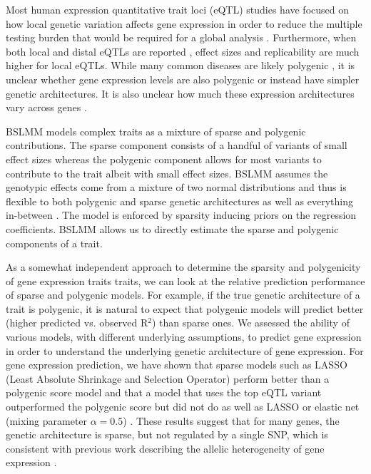 \documentclass[10pt,letterpaper]{article}
\begin{document}
Most human expression quantitative trait loci (eQTL) studies have focused on how local genetic variation affects gene expression in order to reduce the multiple testing burden that would be required for a global analysis \cite{Albert_2015, Stranger_2012}. Furthermore, when both local and distal eQTLs are reported \cite{Stranger_2007,Innocenti_2011,Wright_2014}, effect sizes and replicability are much higher for local eQTLs. While many common diseases are likely polygenic \cite{Purcell_2009,Stahl_2012,Morris_2012}, it is unclear whether gene expression levels are also polygenic or instead have simpler genetic architectures. It is also unclear how much these expression architectures vary across genes \cite{Albert_2015}. 

BSLMM models complex traits as a mixture of sparse and polygenic contributions. The sparse component consists of a handful of variants of small effect sizes whereas the polygenic component allows for most variants to contribute to the trait albeit with small effect sizes. BSLMM assumes the genotypic effects come from a mixture of two normal distributions and thus is flexible to both polygenic and sparse genetic architectures as well as everything in-between \cite{Zhou_2013}. The model is enforced by sparsity inducing priors on the
regression coefficients. BSLMM allows us to directly estimate the sparse and polygenic components of a trait.

As a somewhat independent approach to determine the sparsity and polygenicity of gene expression traits traits, we can look at the relative prediction performance of sparse and polygenic models. For example, if the true genetic architecture of a trait is polygenic, it is natural to expect that polygenic models will predict better (higher predicted vs. observed R$^2$) than sparse ones. We assessed the ability of various models, with different underlying assumptions, to predict gene expression in order to understand the underlying genetic architecture of gene expression. For gene expression prediction, we have shown that sparse models such as LASSO (Least Absolute Shrinkage and Selection Operator) perform better than a polygenic score model and that a model that uses the top eQTL variant outperformed the polygenic score but did not do as well as LASSO or elastic net (mixing parameter $\alpha=0.5$) \cite{Gamazon_2015}. These results suggest that for many genes, the genetic architecture is sparse, but not regulated by a single SNP, which is consistent with previous work describing the allelic heterogeneity of gene expression \cite{brown2013integrative,king2014genetic,zhang2011genetic}. 
\end{document}
